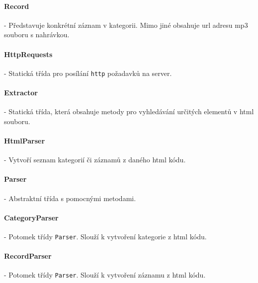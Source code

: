 \documentclass[12pt,a4paper,titlepage]{article}
\begin{document}
	\paragraph{Record}
	- Představuje konkrétní záznam v kategorii. Mimo jiné obsahuje url adresu mp3 souboru s nahrávkou.
	
	\paragraph{HttpRequests}
	- Statická třída pro posílání \texttt{http} požadavků na server.	
	
	\paragraph{Extractor}
	- Statická třída, která obsahuje metody pro vyhledávání určitých elementů v html souboru.
	
	\paragraph{HtmlParser}
	- Vytvoří seznam kategorií či záznamů z daného html kódu.

	\paragraph{Parser}
	- Abstraktní třída s pomocnými  metodami.

	\paragraph{CategoryParser}
	- Potomek třídy \texttt{Parser}. Slouží k vytvoření kategorie z html kódu.

	\paragraph{RecordParser}
	- Potomek třídy \texttt{Parser}. Slouží k vytvoření záznamu z html kódu.
\end{document}
